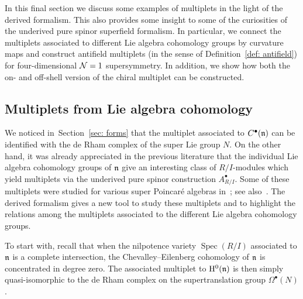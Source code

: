 \documentclass[pdftex]{sigma}
\numberwithin{equation}{section}
\DeclareMathOperator{\Spec}{Spec}
\begin{document}
In this final section we discuss some examples of multiplets in the light of the derived formalism. This also provides some insight to some of the curiosities of the underived pure spinor superfield formalism. In particular, we connect the multiplets associated to different Lie algebra cohomology groups by curvature maps and construct antifield multiplets (in the sense of Definition~\ref{def: antifield}) for four-dimensional $\mathcal N=1$ supersymmetry. In addition, we show how both the on- and off-shell version of the chiral multiplet can be constructed.

\subsection{Multiplets from Lie algebra cohomology} \label{multiplet_from_cohomology_section}

We noticed in~Section~\ref{sec: forms} that the multiplet associated to $C^\bullet(\mathfrak n)$ can be identified with the de Rham complex of the super Lie group $N$. On the other hand, it was already appreciated in the previous literature that the individual Lie algebra cohomology groups of $\mathfrak n$ give an interesting class of $R/I$-modules which yield multiplets via the underived pure spinor construction $A^\bullet_{R/I}$. Some of these multiplets were studied for various super Poincar\'e algebras in~\cite[Section~6.3]{perspectives}; see also~\cite{MSX1}. The derived formalism gives a new tool to study these multiplets and to highlight the relations among the multiplets associated to the different Lie algebra cohomology groups.

To start with, recall that when the nilpotence variety $\Spec (R/I)$ associated to $\mathfrak n$ is a complete intersection, the Chevalley--Eilenberg cohomology of $\mathfrak n$ is concentrated in degree zero. The associated multiplet to $\mathrm H^0(\mathfrak n)$ is then simply quasi-isomorphic to the de Rham complex on the supertranslation group $\Omega^\bullet(N)$.
\end{document}
